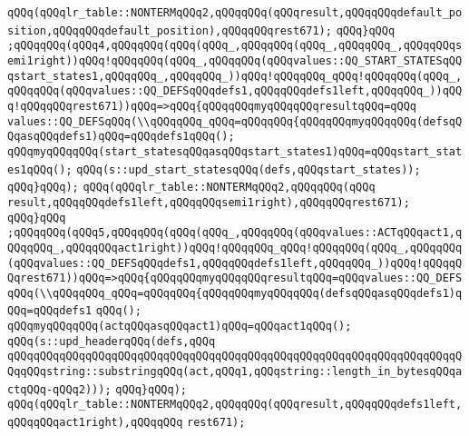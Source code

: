 \verb|qQQq(qQQqlr_table::NONTERMqQQq2,qQQqqQQq(qQQqresult,qQQqqQQqdefault_position,qQQqqQQqdefault_position),qQQqqQQqrest671);|\newline
\verb|qQQq}qQQq|\newline
\verb|;qQQqqQQq(qQQq4,qQQqqQQq(qQQq(qQQq_,qQQqqQQq(qQQq_,qQQqqQQq_,qQQqqQQqsemi1right))qQQq!qQQqqQQq(qQQq_,qQQqqQQq(qQQqvalues::QQ_START_STATESqQQqstart_states1,qQQqqQQq_,qQQqqQQq_))qQQq!qQQqqQQq_qQQq!qQQqqQQq(qQQq_,qQQqqQQq(qQQqvalues::QQ_DEFSqQQqdefs1,qQQqqQQqdefs1left,qQQqqQQq_))qQQq!qQQqqQQqrest671))qQQq=>qQQq{qQQqqQQqmyqQQqqQQqresultqQQq=qQQq|\newline
\verb|values::QQ_DEFSqQQq(\\qQQqqQQq_qQQq=qQQqqQQq{qQQqqQQqmyqQQqqQQq(defsqQQqasqQQqdefs1)qQQq=qQQqdefs1qQQq();|\newline
\verb|qQQqmyqQQqqQQq(start_statesqQQqasqQQqstart_states1)qQQq=qQQqstart_states1qQQq();|\newline
\verb|qQQq(s::upd_start_statesqQQq(defs,qQQqstart_states));|\newline
\verb|qQQq}qQQq);|\newline
\verb|qQQq(qQQqlr_table::NONTERMqQQq2,qQQqqQQq(qQQq|\newline
\verb|result,qQQqqQQqdefs1left,qQQqqQQqsemi1right),qQQqqQQqrest671);|\newline
\verb|qQQq}qQQq|\newline
\verb|;qQQqqQQq(qQQq5,qQQqqQQq(qQQq(qQQq_,qQQqqQQq(qQQqvalues::ACTqQQqact1,qQQqqQQq_,qQQqqQQqact1right))qQQq!qQQqqQQq_qQQq!qQQqqQQq(qQQq_,qQQqqQQq(qQQqvalues::QQ_DEFSqQQqdefs1,qQQqqQQqdefs1left,qQQqqQQq_))qQQq!qQQqqQQqrest671))qQQq=>qQQq{qQQqqQQqmyqQQqqQQqresultqQQq=qQQqvalues::QQ_DEFSqQQq(\\qQQqqQQq_qQQq=qQQqqQQq{qQQqqQQqmyqQQqqQQq(defsqQQqasqQQqdefs1)qQQq=qQQqdefs1|\newline
\verb|qQQq();|\newline
\verb|qQQqmyqQQqqQQq(actqQQqasqQQqact1)qQQq=qQQqact1qQQq();|\newline
\verb|qQQq(s::upd_headerqQQq(defs,qQQq|\newline
\verb|qQQqqQQqqQQqqQQqqQQqqQQqqQQqqQQqqQQqqQQqqQQqqQQqqQQqqQQqqQQqqQQqqQQqqQQqqQQqstring::substringqQQq(act,qQQq1,qQQqstring::length_in_bytesqQQqactqQQq-qQQq2)));|\newline
\verb|qQQq}qQQq);|\newline
\verb|qQQq(qQQqlr_table::NONTERMqQQq2,qQQqqQQq(qQQqresult,qQQqqQQqdefs1left,qQQqqQQqact1right),qQQqqQQq|\newline
\verb|rest671);|\newline
